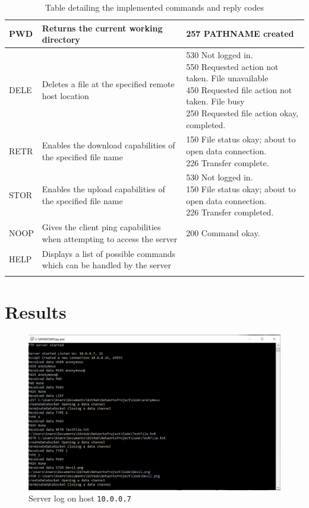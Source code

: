 \documentclass[10pt,twocolumn]{witseiepaper}
\def\code#1{\texttt{#1}}
\begin{document}
\begin{appendices}
\begin{longtable}{|p{2cm}|p{7cm}|p{8cm}|}
	\hline   
	PWD	& Returns the current working directory & 257 PATHNAME created \\ 
	\hline 
	DELE	& Deletes a file at the specified remote host location & \makecell[l]{530 Not logged in. \\550 Requested action not taken. File unavailable \\450 Requested file action not taken. File busy \\250 Requested file action okay, completed.} \\ 
	\hline 
	RETR	& Enables the download capabilities of the specified file name &  \makecell[l]{150 File status okay; about to open data connection. \\226 Transfer complete.} \\ 
	\hline 
	STOR	& Enables the upload capabilities of the specified file name &  \makecell[l]{530 Not logged in. \\150 File status okay; about to open data connection. \\226 Transfer completed.} \\ 
	\hline 
	NOOP	& Gives the client ping capabilities when attempting to access the server & 200 Command okay. \\ 
	\hline 
	HELP	& Displays a list of possible commands which can be handled by the server &  \\ 
	\hline 

	\caption{Table detailing the implemented commands and reply codes}	
		\label{tab:commands}
\end{longtable}
\pagebreak
\section{Results}
\label{app: Results}

\begin{figure}[h!]
\renewcommand{\thefigure}{\arabic{figure}}
\centering
\includegraphics[scale=0.6]{Server.png}
\caption{Server log on host \code{10.0.0.7}}
\label{fig: Server log}
\end{figure}


\end{appendices}
\end{document}
